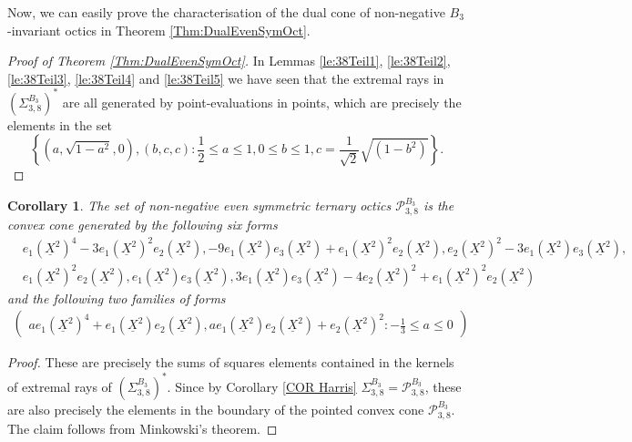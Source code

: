 \documentclass[11pt,a4paper]{amsart}
\numberwithin{equation}{section}
\newtheorem{cor}[thm]{Corollary}
\theoremstyle{definition}
\numberwithin{thm}{section}
\theoremstyle{break}
\numberwithin{subcase}{case}
\begin{document}
 Now, we can easily prove the characterisation of the dual cone of non-negative $B_3$-invariant octics in Theorem \ref{Thm:DualEvenSymOct}.
 \begin{proof}[Proof of Theorem \ref{Thm:DualEvenSymOct}]
 In Lemmas \ref{le:38Teil1}, \ref{le:38Teil2}, \ref{le:38Teil3}, \ref{le:38Teil4} and \ref{le:38Teil5} we have seen that the extremal rays in $\left( \Sigma_{3,8}^{B_3} \right)^\ast$ are all generated by point-evaluations in points, which are precisely the elements in the set $$\left\{\left(a,\sqrt{1-a^2},0\right),{(b,c,c)} : \frac{1}{2} \leq a \leq 1, 0 \leq b \leq 1, c = \frac{1}{\sqrt{2}}\sqrt{(1-b^2)} \right\}.$$
 \end{proof}
 
 \begin{cor}
 The set of non-negative even symmetric ternary octics $\mathcal{P}_{3,8}^{B_3}$ is the convex cone generated by the following six forms \begin{align*}
    & e_1(\underline{X}^2)^4-3e_1(\underline{X}^2)^2e_2(\underline{X}^2),  -9e_1(\underline{X}^2)e_3(\underline{X}^2)+e_1(\underline{X}^2)^2e_2(\underline{X}^2), e_2(\underline{X}^2)^2-3e_1(\underline{X}^2)e_3(\underline{X}^2), \\ & e_1(\underline{X}^2)^2e_2(\underline{X}^2),   e_1(\underline{X}^2)e_3(\underline{X}^2), 3e_1(\underline{X}^2)e_3(\underline{X}^2)-4e_2(\underline{X}^2)^2+e_1(\underline{X}^2)^2e_2(\underline{X}^2) 
 \end{align*}
 and the following two families of forms
 \begin{align*}
      \left( \begin{array}{c}
          ae_1(\underline{X}^2)^4 +e_1(\underline{X}^2)e_2(\underline{X}^2), ae_1(\underline{X}^2)e_2(\underline{X}^2)     + e_2(\underline{X}^2)^2 : -\frac{1}{3} \leq a \leq 0
      \end{array}  \right)
 \end{align*}
 \end{cor}
 \begin{proof}
 These are precisely the sums of squares elements contained in the kernels of extremal rays of $\left(\Sigma_{3,8}^{B_3}\right)^\ast$. Since by Corollary \ref{COR Harris} $\Sigma_{3,8}^{B_3} = \mathcal{P}_{3,8}^{B_3}$, these are also precisely the elements in the boundary of the pointed convex cone $\mathcal{P}_{3,8}^{B_3}$. The claim follows from Minkowski's theorem.
 \end{proof}
 
\end{document}
